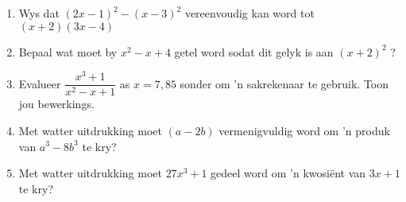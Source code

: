 \begin{eocexercises}{}
\begin{enumerate}[itemsep=5pt, label=\textbf{\arabic*}. ]
\item Wys dat ${(2x-1)}^{2}-{(x-3)}^{2}$ vereenvoudig kan word tot  $(x+2)(3x-4)$

\item Bepaal wat moet by ${x}^{2}-x+4$ getel word sodat dit gelyk is aan ${(x+2)}^{2}$ ?
\item Evalueer $\dfrac{x^{3}+1}{x^{2}-x+1}$ as $x=7,85$ sonder om 'n sakrekenaar te gebruik. Toon jou bewerkings.
\item Met watter uitdrukking moet $(a-2b)$ vermenigvuldig word om 'n produk van $a^3-8b^3$ te kry?
\item Met watter uitdrukking moet $27x^3+1$ gedeel word om 'n kwosi\"ent van $3x+1$ te kry?
\end{enumerate}



\end{eocexercises}
